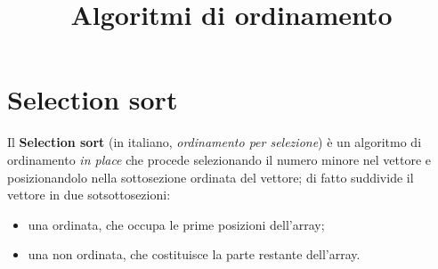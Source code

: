 \usepackage{multirow}         %

\onehalfspacing{}             %

\setcounter{secnumdepth}{3}   %
\setcounter{tocdepth}{3}      %

\usepackage[%
  depth=3,            %
  open=false,         %
  numbered=true       %
]{bookmark}                   %
\usepackage{hyperref}         %

\usepackage[a-1b]{pdfx}
\usepackage[%
  italian,            %
  nameinlink          %
]{cleveref}                   %

\title{\LARGE{\textbf{Algoritmi di ordinamento}}}

\date{}


  \maketitle

  \section{Selection sort}\label{sec:selection}

  Il \textbf{Selection sort} (in italiano, \textit{ordinamento per selezione})
  è un algoritmo di ordinamento \textit{in place} che procede selezionando il numero minore nel vettore
  e posizionandolo nella sottosezione ordinata del vettore;
  di fatto suddivide il vettore in due sotsottosezioni:
  \begin{itemize}[noitemsep]
    \item una ordinata, che occupa le prime posizioni dell'array;
    \item una non ordinata, che costituisce la parte restante dell'array.
  \end{itemize}

